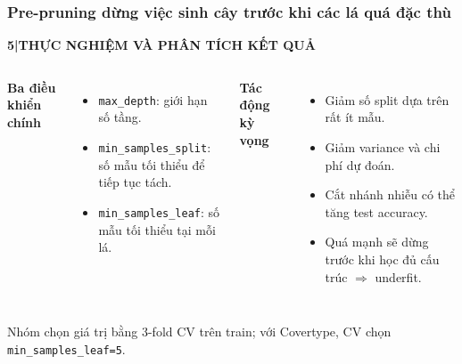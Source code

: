 \documentclass[aspectratio=169,12pt]{beamer}
\newcommand{\chaptertag}[2]{%
  \vspace{-0.16cm}%
  {\scriptsize\bfseries\textcolor{boxframe}{#1\enspace |\enspace #2}}\par
  \vspace{0.12cm}%
}
\begin{document}
\begin{frame}
  \frametitle{Pre-pruning dừng việc sinh cây trước khi các lá quá đặc thù}
  \chaptertag{5}{THỰC NGHIỆM VÀ PHÂN TÍCH KẾT QUẢ}
  \begin{columns}[T,onlytextwidth]
      \textbf{Ba điều khiển chính}
      \begin{itemize}
        \item \texttt{max\_depth}: giới hạn số tầng.
        \item \texttt{min\_samples\_split}: số mẫu tối thiểu để tiếp tục tách.
        \item \texttt{min\_samples\_leaf}: số mẫu tối thiểu tại mỗi lá.
      \end{itemize}
      \textbf{Tác động kỳ vọng}
      \begin{itemize}
        \item Giảm số split dựa trên rất ít mẫu.
        \item Giảm variance và chi phí dự đoán.
        \item Cắt nhánh nhiễu có thể tăng test accuracy.
        \item Quá mạnh sẽ dừng trước khi học đủ cấu trúc $\Rightarrow$ underfit.
      \end{itemize}
  \end{columns}
  \vspace{0.18cm}
  \begin{tcolorbox}[focusbox,width=0.91\textwidth,top=1.5mm,bottom=1.5mm]
    \centering
    Nhóm chọn giá trị bằng 3-fold CV trên train; với Covertype, CV chọn \texttt{min\_samples\_leaf=5}.
  \end{tcolorbox}
\end{frame}
\end{document}
